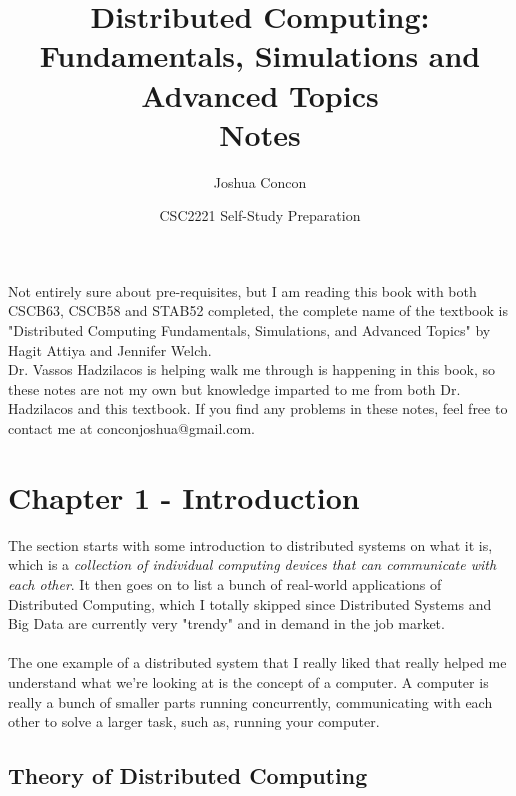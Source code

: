 \documentclass[12pt]{article}
\begin{document}
\title{Distributed Computing: Fundamentals, Simulations and Advanced Topics\\ Notes}
\date{CSC2221 Self-Study Preparation}
\author{Joshua Concon}
\maketitle
Not entirely sure about pre-requisites, but I am reading this book with both CSCB63, CSCB58 and STAB52 completed, the complete name of the textbook is "Distributed Computing Fundamentals, Simulations, and Advanced Topics" by Hagit Attiya and Jennifer Welch.\\
Dr. Vassos Hadzilacos is helping walk me through is happening in this book, so these notes are not my own but knowledge imparted to me from both Dr. Hadzilacos and this textbook. If you find any problems in these notes, feel free to contact me at conconjoshua@gmail.com.

\tableofcontents

\pagebreak

\section{Chapter 1 - Introduction}

The section starts with some introduction to distributed systems on what it is, which is a \textit{collection of individual computing devices that can communicate with each other}. It then goes on to list a bunch of real-world applications of Distributed Computing, which I totally skipped since Distributed Systems and Big Data are currently very "trendy" and in demand in the job market.\\
\\
The one example of a distributed system that I really liked that really helped me understand what we're looking at is the concept of a computer. A computer is really a bunch of smaller parts running concurrently, communicating with each other to solve a larger task, such as, running your computer.

\subsection{Theory of Distributed Computing}
\end{document}
